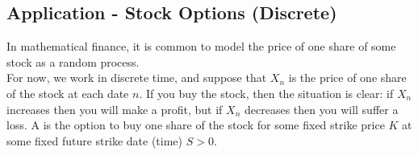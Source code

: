 \documentclass[11pt]{article}
\begin{document}
   	
   	\subsection{Application - Stock Options (Discrete)}
   	In mathematical finance, it is common to model the price of one share of some stock as a random process.\\
   	For now, we work in discrete time, and suppose that $X_n$ is the price of one share of the stock at each date $n$. If you buy the stock, then the situation is clear: if $X_n$ increases then you will make a profit, but if $X_n$ decreases then you will suffer a loss.
   	A  is the option to buy one share of the stock for some fixed strike price $K$ at some fixed future strike date (time) $S > 0$.
    
    
    
    
    
    
    
    
    
\end{document}
